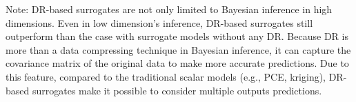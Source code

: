 Note: DR-based surrogates are not only limited to Bayesian inference in high dimensions. Even in low dimension's inference, DR-based surrogates still outperform than the case with surrogate models without any \acrshort{DR}. Because \acrshort{DR} is more than a data compressing technique in Bayesian inference, it can capture the covariance matrix of the original data to make more accurate predictions. Due to this feature, compared to the traditional scalar models (e.g., PCE, kriging), DR-based surrogates make it possible to consider multiple outputs predictions.





